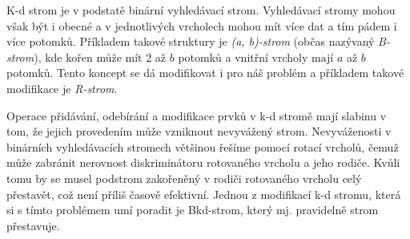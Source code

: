 K-d strom je v podstatě binární vyhledávací strom. Vyhledávací stromy mohou však být i obecné a v jednotlivých vrcholech mohou mít více dat a tím pádem i více potomků. Příkladem takové struktury je \textit{(a, b)-strom} (občas nazývaný \textit{B-strom}), kde kořen může mít 2 až $b$ potomků a vnitřní vrcholy mají $a$ až $b$ potomků.\cite[s.~190--198]{pruvodce} Tento koncept se dá modifikovat i pro náš problém a příkladem takové modifikace je \textit{R-strom}.\cite{r-tree}

Operace přidávání, odebírání a modifikace prvků v k-d stromě mají slabinu v tom, že jejich provedením může vzniknout nevyvážený strom. Nevyváženosti v binárních vyhledávacích stromech většinou řešíme pomocí rotací vrcholů, čemuž může zabránit nerovnost diskriminátoru rotovaného vrcholu a jeho rodiče. Kvůli tomu by se musel podstrom zakořeněný v rodiči rotovaného vrcholu celý přestavět, což není příliš časově efektivní. Jednou z modifikací k-d stromu, která si s tímto problémem umí poradit je Bkd-strom, který mj. pravidelně strom přestavuje.\cite{bkd-tree}

